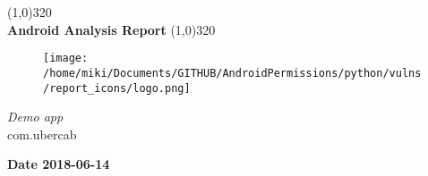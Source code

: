\documentclass[12p]{article}
\begin{document}
\begin{titlepage}
\begin{center}
\line(1,0){320}\\
[0.25in]
\huge{\bfseries Android Analysis Report}
\line(1,0){320}\\
[0.5in]
\begin{figure}[H]
	\centering
	\texttt{[image: /home/miki/Documents/GITHUB/AndroidPermissions/python/vulns/report\_icons/logo.png]}
\end{figure}
\textsl{\LARGE Demo app}\\
\textsf{\LARGE com.ubercab}\\
[2.5in]
\end{center}
\begin{flushright}
\textbf{\large Date 2018-06-14}
\end{flushright}
\end{titlepage}
\tableofcontents
\thispagestyle{empty}
\cleardoublepage
\setcounter{page}{1}
\end{document}
